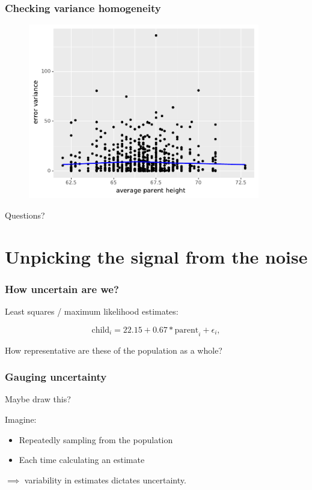 \documentclass[handout]{beamer}
\begin{document}
\begin{frame}
	\frametitle{Checking variance homogeneity}
	
	\begin{figure}[ht]
		\centerline{\includegraphics[width=0.9\textwidth]{../figures/galton_variance.pdf}}
	\end{figure}
	
\end{frame}

\begin{frame}
	
	\Large Questions?
\end{frame}

\section{Unpicking the signal from the noise}
\frame{\tableofcontents[currentsection]}

\begin{frame}
	\frametitle{How uncertain are we?}
	
	Least squares / maximum likelihood estimates:
	
	\begin{equation}
	\text{child}_i = 22.15 + 0.67 * \text{parent}_i + \epsilon_i,
	\end{equation}
	
	How representative are these of the population as a whole?
	
\end{frame}

\begin{frame}
	\frametitle{Gauging uncertainty}
	
	Maybe draw this?
	
	Imagine:
	
	\begin{itemize}
		\item Repeatedly sampling from the population
		\item Each time calculating an estimate
	\end{itemize}
	
	$\implies$ variability in estimates dictates uncertainty.
	
\end{frame}
\end{document}
